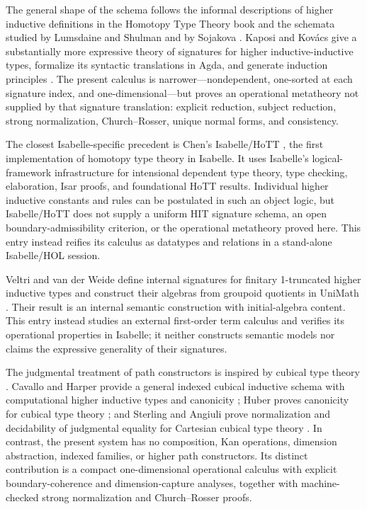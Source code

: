 \documentclass[11pt,a4paper]{article}
\begin{document}
{\sloppy
The general shape of the schema follows the informal descriptions of higher
inductive definitions in the Homotopy Type Theory book \cite{HoTTBook2013} and
the schemata studied by Lumsdaine and Shulman \cite{LumsdaineShulman2020} and
by Sojakova \cite{Sojakova2015}. Kaposi and Kov\'acs give a substantially more
expressive theory of signatures for higher inductive-inductive types, formalize
its syntactic translations in Agda, and generate induction principles
\cite{KaposiKovacs2020}. The present calculus is narrower---nondependent,
one-sorted at each signature index, and one-dimensional---but proves an
operational metatheory not supplied by that signature translation: explicit
reduction, subject reduction, strong normalization, Church--Rosser, unique
normal forms, and consistency.

The closest Isabelle-specific precedent is Chen's Isabelle/HoTT
\cite{Chen2021}, the first implementation of homotopy type theory in Isabelle.
It uses Isabelle's logical-framework infrastructure for intensional dependent
type theory, type checking, elaboration, Isar proofs, and foundational HoTT
results. Individual higher inductive constants and rules can be postulated in
such an object logic, but Isabelle/HoTT does not supply a uniform HIT signature
schema, an open boundary-admissibility criterion, or the operational
metatheory proved here. This entry instead reifies its calculus as datatypes and
relations in a stand-alone Isabelle/HOL session.

Veltri and van der Weide define internal signatures for finitary 1-truncated
higher inductive types and construct their algebras from groupoid quotients in
UniMath \cite{VeltriVanDerWeide2021}. Their result is an internal semantic
construction with initial-algebra content. This entry instead studies an
external first-order term calculus and verifies its operational properties in
Isabelle; it neither constructs semantic models nor claims the expressive
generality of their signatures.

The judgmental treatment of path constructors is inspired by cubical type
theory \cite{CohenCoquandHuberMoertberg2018}. Cavallo and Harper provide a
general indexed cubical inductive schema with computational higher inductive
types and canonicity \cite{CavalloHarper2019}; Huber proves canonicity for
cubical type theory \cite{Huber2019}; and Sterling and Angiuli prove
normalization and decidability of judgmental equality for Cartesian cubical
type theory \cite{SterlingAngiuli2021}. In contrast, the present system has no
composition, Kan operations, dimension abstraction, indexed families, or
higher path constructors. Its distinct contribution is a compact
one-dimensional operational calculus with explicit boundary-coherence and
dimension-capture analyses, together with machine-checked strong normalization
and Church--Rosser proofs.
\par}
\end{document}
